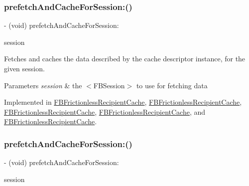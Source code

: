 \subsubsection{\texorpdfstring{prefetch\+And\+Cache\+For\+Session\+:()}{prefetchAndCacheForSession:()}\hspace{0.1cm}{\footnotesize\ttfamily [4/5]}}
{\footnotesize\ttfamily -\/ (void) prefetch\+And\+Cache\+For\+Session\+: \begin{DoxyParamCaption}\item[{(\hyperlink{interfaceFBSession}{F\+B\+Session} $\ast$)}]{session }\end{DoxyParamCaption}}

Fetches and caches the data described by the cache descriptor instance, for the given session.


\begin{DoxyParams}{Parameters}
{\em session} & the $<$\+F\+B\+Session$>$ to use for fetching data \\
\hline
\end{DoxyParams}


Implemented in \hyperlink{interfaceFBFrictionlessRecipientCache_a4f218828f2b6a8bb5a8e0044e98689dc}{F\+B\+Frictionless\+Recipient\+Cache}, \hyperlink{interfaceFBFrictionlessRecipientCache_a4f218828f2b6a8bb5a8e0044e98689dc}{F\+B\+Frictionless\+Recipient\+Cache}, \hyperlink{interfaceFBFrictionlessRecipientCache_a4f218828f2b6a8bb5a8e0044e98689dc}{F\+B\+Frictionless\+Recipient\+Cache}, \hyperlink{interfaceFBFrictionlessRecipientCache_a4f218828f2b6a8bb5a8e0044e98689dc}{F\+B\+Frictionless\+Recipient\+Cache}, and \hyperlink{interfaceFBFrictionlessRecipientCache_a4f218828f2b6a8bb5a8e0044e98689dc}{F\+B\+Frictionless\+Recipient\+Cache}.

\mbox{\label{interfaceFBCacheDescriptor_a1d3bbb38753d402a6f08e9402904a8d6}} 
\subsubsection{\texorpdfstring{prefetch\+And\+Cache\+For\+Session\+:()}{prefetchAndCacheForSession:()}\hspace{0.1cm}{\footnotesize\ttfamily [5/5]}}
{\footnotesize\ttfamily -\/ (void) prefetch\+And\+Cache\+For\+Session\+: \begin{DoxyParamCaption}\item[{(\hyperlink{interfaceFBSession}{F\+B\+Session} $\ast$)}]{session }\end{DoxyParamCaption}}

